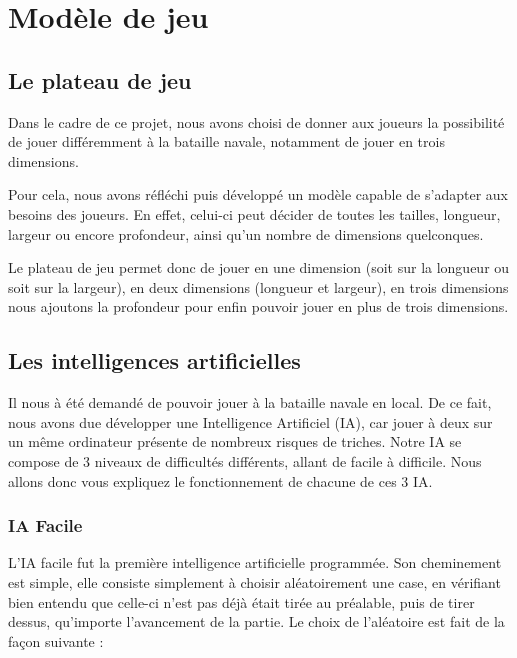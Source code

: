 \section{Modèle de jeu}

\subsection{Le plateau de jeu}

	Dans le cadre de ce projet, nous avons choisi de donner aux joueurs la possibilité de jouer différemment à la bataille navale, notamment de jouer en trois dimensions.\newline
	
	Pour cela, nous avons réfléchi puis développé un modèle capable de s'adapter aux besoins des joueurs. En effet, celui-ci peut décider de toutes les tailles, longueur, largeur ou encore profondeur, ainsi qu'un nombre de dimensions quelconques. \newline
	
	Le plateau de jeu permet donc de jouer en une dimension (soit sur la longueur ou soit sur la largeur), en deux dimensions (longueur et largeur), en trois dimensions nous ajoutons la profondeur pour enfin pouvoir jouer en plus de trois dimensions.\newline
	

\subsection{Les intelligences artificielles}
	Il nous à été demandé de pouvoir jouer à la bataille navale en local. 
De ce fait, nous avons due développer une Intelligence Artificiel (IA), car jouer à deux sur un même ordinateur présente de nombreux risques de triches.\newline
	Notre IA se compose de 3 niveaux de difficultés différents, allant de facile à difficile.\newline
	Nous allons donc vous expliquez le fonctionnement de chacune de ces 3 IA.\newline

\subsubsection{IA Facile}
    L'IA facile fut la première intelligence artificielle programmée. Son cheminement est simple, elle consiste simplement à choisir aléatoirement une case, en vérifiant bien entendu que celle-ci n'est pas déjà était tirée au préalable, puis de tirer dessus, qu'importe l'avancement de la partie.\newline
    Le choix de l'aléatoire est fait de la façon suivante :\newline
    
